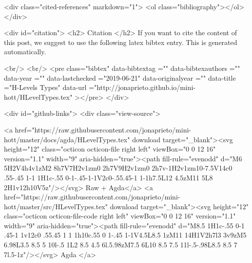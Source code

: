   <div class="cited-references" markdown="1">
  <ol class="bibliography"></ol>
  </div>


  
  <div id="citation">
  <h2> Citation </h2>
  If you want to cite the content of this post,
  we suggest to use the following latex bibtex entry.
  This is generated automatically.

  <br/>
  <br/>
  <pre class="bibtex"
       data-bibtextag =""
       data-bibtexauthors =""
       data-year =""
       data-lastchecked ="2019-06-21"
       data-originalyear =""
       data-title ="H-Levels Types"
       data-url ="http://jonaprieto.github.io/mini-hott/HLevelTypes.tex"
  ></pre>
  </div>
  

  <div id="github-links">
    <div class="view-source">
      
        <a href="https://raw.githubusercontent.com/jonaprieto/mini-hott/master/docs/agda/HLevelTypes.tex" download target="_blank"><svg height="12" class="octicon octicon-file right left" viewBox="0 0 12 16" version="1.1" width="9" aria-hidden="true"><path fill-rule="evenodd" d="M6 5H2V4h4v1zM2 8h7V7H2v1zm0 2h7V9H2v1zm0 2h7v-1H2v1zm10-7.5V14c0 .55-.45 1-1 1H1c-.55 0-1-.45-1-1V2c0-.55.45-1 1-1h7.5L12 4.5zM11 5L8 2H1v12h10V5z"/></svg> Raw + Agda</a>
        <a href="https://raw.githubusercontent.com/jonaprieto/mini-hott/master/src/HLevelTypes.tex" download target="_blank"><svg height="12" class="octicon octicon-file-code right left" viewBox="0 0 12 16" version="1.1" width="9" aria-hidden="true"><path fill-rule="evenodd" d="M8.5 1H1c-.55 0-1 .45-1 1v12c0 .55.45 1 1 1h10c.55 0 1-.45 1-1V4.5L8.5 1zM11 14H1V2h7l3 3v9zM5 6.98L3.5 8.5 5 10l-.5 1L2 8.5 4.5 6l.5.98zM7.5 6L10 8.5 7.5 11l-.5-.98L8.5 8.5 7 7l.5-1z"/></svg> Agda </a>
      
